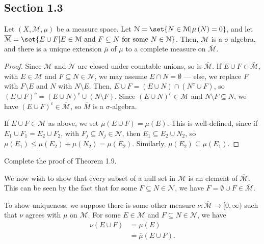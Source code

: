 \documentclass[10pt]{mypackage}
\begin{document}
\subsection{Section 1.3}%
\begin{theorem}[Theorem 1.9]
  Let $\left(X,\mathcal{M},\mu\right)$ be a measure space. Let $\mathcal{N} = \set{N\in \mathcal{M} | \mu\left(N\right) = 0}$, and let $\overline{\mathcal{M}} = \set{E\cup F | E\in \mathcal{M}\text{ and }F\subseteq N\text{ for some }N\in \mathcal{N}}$. Then, $\mathcal{M}$ is a $\sigma$-algebra, and there is a unique extension $\overline{\mu}$ of $\mu$ to a complete measure on $\overline{\mathcal{M}}$.
\end{theorem}
\begin{proof}
  Since $\mathcal{M}$ and $\mathcal{N}$ are closed under countable unions, so is $\overline{\mathcal{M}}$. If $E\cup F\in \overline{\mathcal{M}}$, with $E\in \mathcal{M}$ and $F\subseteq N\in \mathcal{N}$, we may assume $E\cap N = \emptyset$ --- else, we replace $F$ with $F\setminus E$ and $N$ with $N\setminus E$. Then, $E\cup F = \left(E\cup N\right)\cap \left(N^{c}\cup F\right)$, so
  $\left(E\cup F\right)^{c} = \left(E\cup N\right)^{c}\cup \left(N\setminus F\right)$. Since $\left(E\cup N\right)^{c}\in \mathcal{M}$ and $N\setminus F\subseteq N$, we have $\left(E\cup F\right)^{c}\in \overline{\mathcal{M}}$, so $\overline{M}$ is a $\sigma$-algebra.\newline

  If $E\cup F \in \overline{\mathcal{M}}$ as above, we set $\overline{\mu}\left(E\cup F\right) = \mu\left(E\right)$. This is well-defined, since if $E_1 \cup F_1 = E_2\cup F_2$, with $F_j\subseteq N_j\in \mathcal{N}$, then $E_1 \subseteq E_2\cup N_2$, so $\mu\left(E_1\right)\leq \mu\left(E_2\right) + \mu\left(N_2\right) = \mu\left(E_2\right)$. Similarly, $\mu\left(E_2\right)\subseteq \mu\left(E_1\right)$.
\end{proof}
\begin{exercise}[Exercise 6]
Complete the proof of Theorem 1.9.
\end{exercise}
\begin{solution}
  We now wish to show that every subset of a null set in $\mathcal{M}$ is an element of $\overline{\mathcal{M}}$. This can be seen by the fact that for some $F\subseteq N\in \mathcal{N}$, we have $F = \emptyset \cup F\in \overline{\mathcal{M}}$.\newline

  To show uniqueness, we suppose there is some other measure $\nu\colon \overline{\mathcal{M}}\rightarrow [0,\infty)$ such that $\nu$ agrees with $\mu$ on $\mathcal{M}$. For some $E\in \mathcal{M}$ and $F\subseteq N\in \mathcal{N}$, we have
  \begin{align*}
    \nu\left(E\cup F\right) &= \mu\left(E\right)\\
                            &= \overline{\mu}\left(E\cup F\right).
  \end{align*}
\end{solution}
\end{document}
